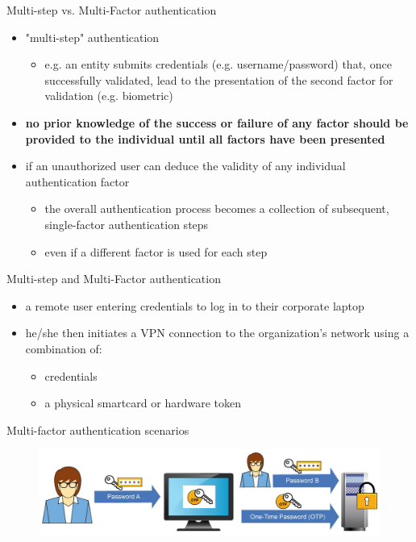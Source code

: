\documentclass[pdf]{beamer}
\begin{document}
\begin{frame}{Multi-step vs. Multi-Factor authentication}
\begin{itemize}
\item
"multi-step" authentication

\begin{itemize}
\item
e.g. an entity submits credentials (e.g. username/password) that, once successfully validated, lead to the presentation of the second factor for validation (e.g. biometric)
\end{itemize}

\item
\textbf{no prior knowledge of the success or failure of any factor should be provided to the individual until all factors have been presented}

\item
if an unauthorized user can deduce the validity of any individual authentication factor

\begin{itemize}
\item
the overall authentication process becomes a collection of subsequent, single-factor authentication steps
\item
even if a different factor is used for each step
\end{itemize}

\end{itemize}
\end{frame}



\begin{frame}{Multi-step and Multi-Factor authentication}
\begin{itemize}
\item
a remote user entering credentials to log in to their corporate laptop
\item
he/she then initiates a VPN connection to the organization’s network using a combination of:
\begin{itemize}
\item
credentials
\item
a physical smartcard or hardware token
\end{itemize}
\end{itemize}
\end{frame}



\begin{frame}{Multi-factor authentication scenarios}

\begin{figure}[t]
\centering
\includegraphics[scale=0.35]{Images/scenario1}
\end{figure}

\end{frame}
\end{document}
